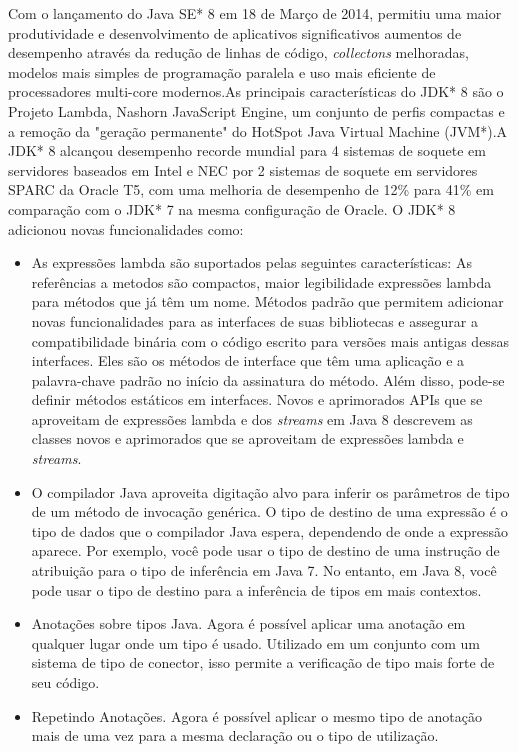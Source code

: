 Com o lançamento do Java SE* 8 em 18 de Março de 2014, permitiu uma maior produtividade e desenvolvimento de aplicativos significativos aumentos de desempenho através da redução de linhas de código, {\it collectons} melhoradas, modelos mais simples de programação paralela e uso mais eficiente de processadores multi-core modernos.As principais características do JDK* 8 são o Projeto Lambda, Nashorn JavaScript Engine, um conjunto de perfis compactas e a remoção da "geração permanente" do HotSpot Java Virtual Machine (JVM*).A JDK* 8 alcançou desempenho recorde mundial para 4 sistemas de soquete em servidores baseados em Intel e NEC por 2 sistemas de soquete em servidores SPARC da Oracle T5, com uma melhoria de desempenho de 12\% para 41\% em comparação com o JDK* 7 na mesma configuração de Oracle.
O JDK* 8 adicionou novas funcionalidades como:
  \begin{itemize}
  \item As expressões lambda são suportados pelas seguintes características: As referências a metodos são compactos, maior legibilidade expressões lambda para métodos que já têm um nome. Métodos padrão que permitem adicionar novas funcionalidades para as interfaces de suas bibliotecas e assegurar a compatibilidade binária com o código escrito para versões mais antigas dessas interfaces. Eles são os métodos de interface que têm uma aplicação e a palavra-chave padrão no início da assinatura do método. Além disso, pode-se definir métodos estáticos em interfaces. Novos e aprimorados APIs que se aproveitam de expressões lambda e dos {\it streams} em Java 8 descrevem as classes novos e aprimorados que se aproveitam de expressões lambda e {\it streams}.
  \item O compilador Java aproveita digitação alvo para inferir os parâmetros de tipo de um método de invocação genérica. O tipo de destino de uma expressão é o tipo de dados que o compilador Java espera, dependendo de onde a expressão aparece. Por exemplo, você pode usar o tipo de destino de uma instrução de atribuição para o tipo de inferência em Java 7. No entanto, em Java 8, você pode usar o tipo de destino para a inferência de tipos em mais contextos.
  \item Anotações sobre tipos Java. Agora é possível aplicar uma anotação em qualquer lugar onde um tipo é usado. Utilizado em um conjunto com um sistema de tipo de conector, isso permite a verificação de tipo mais forte de seu código.
  \item  Repetindo Anotações. Agora é possível aplicar o mesmo tipo de anotação mais de uma vez para a mesma declaração ou o tipo de utilização.\\
  \end{itemize}


								